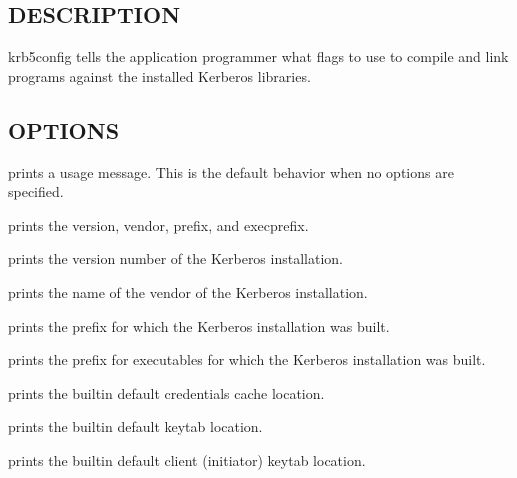 \documentclass[letterpaper,10pt,english]{sphinxmanual}
\begin{document}
\subsection{DESCRIPTION}
\label{\detokenize{user/user_commands/krb5-config:description}}
\sphinxAtStartPar
krb5\sphinxhyphen{}config tells the application programmer what flags to use to compile
and link programs against the installed Kerberos libraries.


\subsection{OPTIONS}
\label{\detokenize{user/user_commands/krb5-config:options}}\begin{description}
\sphinxAtStartPar
prints a usage message.  This is the default behavior when no options
are specified.

\sphinxAtStartPar
prints the version, vendor, prefix, and exec\sphinxhyphen{}prefix.

\sphinxAtStartPar
prints the version number of the Kerberos installation.

\sphinxAtStartPar
prints the name of the vendor of the Kerberos installation.

\sphinxAtStartPar
prints the prefix for which the Kerberos installation was built.

\sphinxAtStartPar
prints the prefix for executables for which the Kerberos installation
was built.

\sphinxAtStartPar
prints the built\sphinxhyphen{}in default credentials cache location.

\sphinxAtStartPar
prints the built\sphinxhyphen{}in default keytab location.

\sphinxAtStartPar
prints the built\sphinxhyphen{}in default client (initiator) keytab location.


\end{description}
\end{document}
